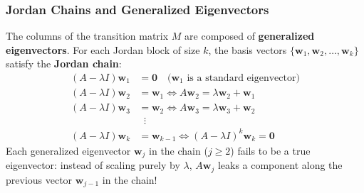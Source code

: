 \subsubsection{Jordan Chains and Generalized Eigenvectors}
The columns of the transition matrix $M$ are composed of \textbf{generalized eigenvectors}. For each Jordan block of size $k$, the basis vectors $\{\mathbf{w}_1, \mathbf{w}_2, \dots, \mathbf{w}_k\}$ satisfy the \textbf{Jordan chain}:
\begin{align}
(A - \lambda I)\mathbf{w}_1 &= \mathbf{0} \quad \text{($\mathbf{w}_1$ is a standard eigenvector)} \nonumber \\
(A - \lambda I)\mathbf{w}_2 &= \mathbf{w}_1 \iff A\mathbf{w}_2 = \lambda \mathbf{w}_2 + \mathbf{w}_1 \nonumber \\
(A - \lambda I)\mathbf{w}_3 &= \mathbf{w}_2 \iff A\mathbf{w}_3 = \lambda \mathbf{w}_3 + \mathbf{w}_2 \nonumber \\
&\;\;\vdots \nonumber \\
(A - \lambda I)\mathbf{w}_k &= \mathbf{w}_{k-1} \iff (A - \lambda I)^k \mathbf{w}_k = \mathbf{0}
\label{eq:jordan_chain}
\end{align}
Each generalized eigenvector $\mathbf{w}_j$ in the chain ($j \ge 2$) fails to be a true eigenvector: instead of scaling purely by $\lambda$, $A\mathbf{w}_j$ leaks a component along the previous vector $\mathbf{w}_{j-1}$ in the chain!

